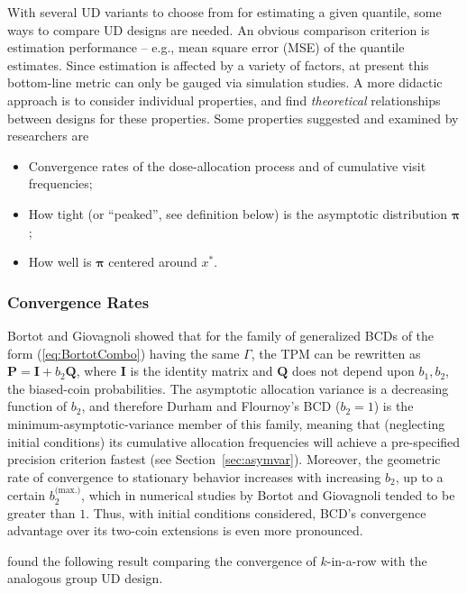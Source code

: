 With several UD variants to choose from for estimating a given quantile, some ways to compare UD designs are needed. An obvious comparison criterion is estimation performance -- e.g., mean square error (MSE) of the quantile estimates. Since estimation is affected by a variety of factors, at present this bottom-line metric can only be gauged via simulation studies. A more didactic approach is to consider individual properties, and find \emph{theoretical} relationships between designs for these properties. Some properties suggested and examined by researchers are

\begin{itemize}
\item Convergence rates of the dose-allocation process and of cumulative visit frequencies;
\item How tight (or ``peaked'', see definition below) is the asymptotic distribution $\boldsymbol{\pi}$;
\item How well is $\boldsymbol{\pi}$ centered around $x^*$.
\end{itemize}

\subsubsection{Convergence Rates}

Bortot and Giovagnoli showed that for the family of generalized BCDs of the form (\ref{eq:BortotCombo}) having the same $\Gamma$, the TPM can be rewritten as $\mathbf{P}=\mathbf{I}+b_2\mathbf{Q}$, where $\mathbf{I}$ is the identity matrix and $\mathbf{Q}$ does not depend upon $b_1,b_2$, the biased-coin probabilities. The asymptotic allocation variance is a decreasing function of $b_2$, and therefore Durham and Flournoy's BCD ($b_2=1$) is the minimum-asymptotic-variance member of this family, meaning that (neglecting initial conditions) its cumulative allocation frequencies will achieve a pre-specified precision criterion fastest (see Section~\ref{sec:asymvar}). Moreover, the geometric rate of convergence to stationary behavior increases with increasing $b_2$, up to a certain $b_2^\textrm{(max.)}$, which in numerical studies by Bortot and Giovagnoli tended to be greater than $1$. Thus, with initial conditions considered, BCD's convergence advantage over its two-coin extensions is even more pronounced.

\cite{Oron:Hoff:thek:2009} found the following result comparing the convergence of $k$-in-a-row with the analogous group UD design.


